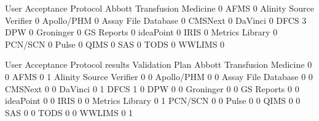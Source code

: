 \documentclass{article}
\begin{document}
\begin{Schunk}
\begin{Soutput}
                              User Acceptance Protocol
  Abbott Transfusion Medicine                        0
  AFMS                                               0
  Alinity Source Verifier                            0
  Apollo/PHM                                         0
  Assay File Database                                0
  CMSNext                                            0
  DaVinci                                            0
  DFCS                                               3
  DPW                                                0
  Groninger                                          0
  GS Reports                                         0
  ideaPoint                                          0
  IRIS                                               0
  Metrics Library                                    0
  PCN/SCN                                            0
  Pulse                                              0
  QIMS                                               0
  SAS                                                0
  TODS                                               0
  WWLIMS                                             0
                             
                              User Acceptance Protocol results Validation Plan
  Abbott Transfusion Medicine                                0               0
  AFMS                                                       0               1
  Alinity Source Verifier                                    0               0
  Apollo/PHM                                                 0               0
  Assay File Database                                        0               0
  CMSNext                                                    0               0
  DaVinci                                                    0               1
  DFCS                                                       1               0
  DPW                                                        0               0
  Groninger                                                  0               0
  GS Reports                                                 0               0
  ideaPoint                                                  0               0
  IRIS                                                       0               0
  Metrics Library                                            0               1
  PCN/SCN                                                    0               0
  Pulse                                                      0               0
  QIMS                                                       0               0
  SAS                                                        0               0
  TODS                                                       0               0
  WWLIMS                                                     0               1
\end{Soutput}
\end{Schunk}
\end{document}
